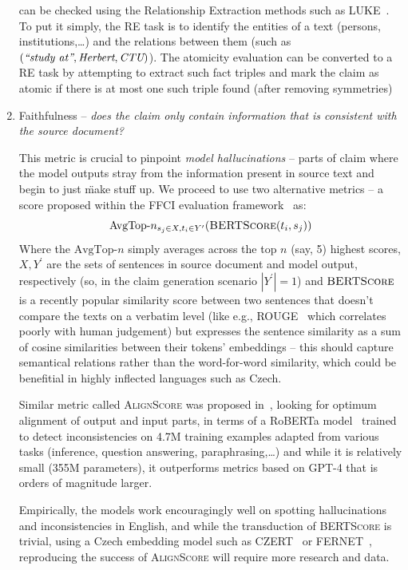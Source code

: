 \begin{enumerate}
    can be checked using the Relationship Extraction methods such as LUKE~\cite{yamada2020luke}. To put it simply, the RE task is to identify the entities of a text (persons, institutions,\dots) and the relations between them (such as $(\textit{\"{study at}}, \textit{Herbert}, \textit{CTU})$). The atomicity evaluation can be converted to a RE task by attempting to extract such fact triples and mark the claim as atomic if there is at most one such triple found (after removing symmetries)

    \item {\techbf Faithfulness} -- \textit{does the claim only contain information that is consistent with the source document?}
    
    This metric is crucial to pinpoint \textit{model hallucinations} -- parts of claim where the model outputs stray from the information present in source text and begin to just \"{make stuff up}. We proceed to use two alternative metrics -- a score proposed within the FFCI evaluation framework~\cite{ffci} as: 
    $$\text{AvgTop-}n_{s_j\in X, t_i\in Y^\prime}(\textsc{BERTScore}(t_i,s_j))$$
    Where the $\text{AvgTop-}n$ simply averages across the top $n$ (say, 5) highest scores, $X,Y^\prime$ are the sets of sentences in source document and model output, respectively (so, in the claim generation scenario $|Y^\prime|=1$) and $\textsc{BERTScore}$~\cite{bert-score} is a recently popular similarity score between two sentences that doesn't compare the texts on a verbatim level (like e.g., ROUGE~\cite{lin-2004-rouge} which correlates poorly with human judgement) but expresses the sentence similarity as a sum of cosine similarities between their tokens' embeddings -- this should capture semantical relations rather than the word-for-word similarity, which could be benefitial in highly inflected languages such as Czech.

    Similar metric called \textsc{AlignScore} was proposed in~\cite{zha2023alignscore}, looking for optimum alignment of output and input parts, in terms of a RoBERTa model~\cite{roberta} trained to detect inconsistencies on 4.7M training examples adapted from various tasks (inference, question answering, paraphrasing,\dots) and while it is relatively small (355M parameters), it outperforms metrics based on GPT-4 that is orders of magnitude larger. 

    Empirically, the models work encouragingly well on spotting hallucinations and inconsistencies in English, and while the transduction of \textsc{BERTScore} is trivial, using a Czech embedding model such as CZERT~\cite{czert} or FERNET~\cite{fernet}, reproducing the success of \textsc{AlignScore} will require more research and data.


\end{enumerate}
